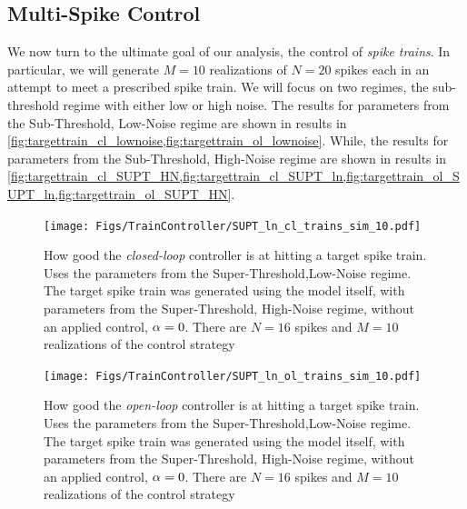 \documentclass[12pt]{iopart}
\begin{document}
\subsection{Multi-Spike Control}
We now turn to the ultimate goal of our analysis, the control of {\sl spike
trains}. In particular, we will generate $M=10$ realizations of $N=20$ spikes
each in an attempt to meet a prescribed spike train. We will focus on two
regimes, the sub-threshold regime with either low or high noise.
The results
for parameters from the Sub-Threshold, Low-Noise regime are shown in
results in \cref{fig:targettrain_cl_lownoise,fig:targettrain_ol_lownoise}.
While, the results
for parameters from the Sub-Threshold, High-Noise regime are shown in
results in
\cref{fig:targettrain_cl_SUPT_HN,fig:targettrain_cl_SUPT_ln,fig:targettrain_ol_SUPT_ln,fig:targettrain_ol_SUPT_HN}.
\begin{figure}[htp]
\begin{center}
  \texttt{[image: Figs/TrainController/SUPT\_ln\_cl\_trains\_sim\_10.pdf]}
  \caption[ ]{How good the {\sl closed-loop} controller is at hitting a target
  spike train. Uses the parameters from the Super-Threshold,Low-Noise regime.
  The target spike train was generated using the model itself, with
  parameters from the Super-Threshold, High-Noise regime, without an applied
  control, ${\alpha}=0$.
  There are $N=16$ spikes and $M=10$ realizations of the control strategy} 
  \label{fig:targettrain_cl_SUPT_ln}
\end{center}
\end{figure}  
\begin{figure}[htp] 
\begin{center}
  \texttt{[image: Figs/TrainController/SUPT\_ln\_ol\_trains\_sim\_10.pdf]}
  \caption[ ]{How good the {\sl open-loop} controller is at hitting a target
  spike train. Uses the parameters from the Super-Threshold,Low-Noise regime.
  The target spike train was generated using the model itself, with
  parameters from the Super-Threshold, High-Noise regime, without an applied
  control, ${\alpha}=0$.
  There are $N=16$ spikes and $M=10$ realizations of the control strategy}
  \label{fig:targettrain_ol_SUPT_ln}
\end{center} 
\end{figure}
\end{document}

